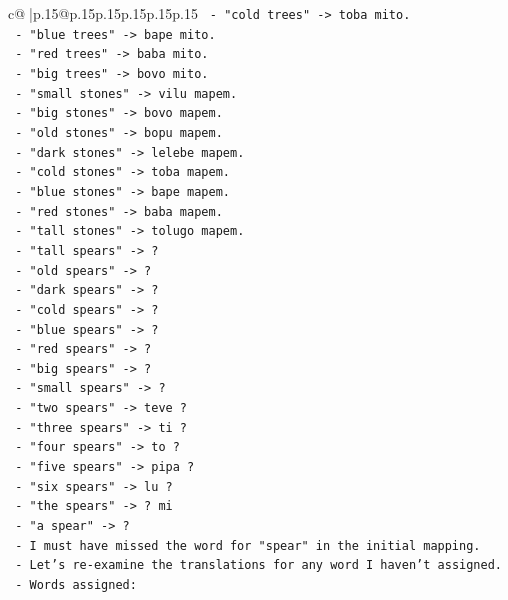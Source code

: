 \documentclass{article}
\begin{document}
{\begin{supertabular}{c@{$\;$}|p{.15\linewidth}@{}p{.15\linewidth}p{.15\linewidth}p{.15\linewidth}p{.15\linewidth}p{.15\linewidth}}
{{{\texttt{    {-} "cold trees" {-}> toba mito.} \\
\texttt{    {-} "blue trees" {-}> bape mito.} \\
\texttt{    {-} "red trees" {-}> baba mito.} \\
\texttt{    {-} "big trees" {-}> bovo mito.} \\
\texttt{    {-} "small stones" {-}> vilu mapem.} \\
\texttt{    {-} "big stones" {-}> bovo mapem.} \\
\texttt{    {-} "old stones" {-}> bopu mapem.} \\
\texttt{    {-} "dark stones" {-}> lelebe mapem.} \\
\texttt{    {-} "cold stones" {-}> toba mapem.} \\
\texttt{    {-} "blue stones" {-}> bape mapem.} \\
\texttt{    {-} "red stones" {-}> baba mapem.} \\
\texttt{    {-} "tall stones" {-}> tolugo mapem.} \\
\texttt{    {-} "tall spears" {-}> ?} \\
\texttt{    {-} "old spears" {-}> ?} \\
\texttt{    {-} "dark spears" {-}> ?} \\
\texttt{    {-} "cold spears" {-}> ?} \\
\texttt{    {-} "blue spears" {-}> ?} \\
\texttt{    {-} "red spears" {-}> ?} \\
\texttt{    {-} "big spears" {-}> ?} \\
\texttt{    {-} "small spears" {-}> ?} \\
\texttt{    {-} "two spears" {-}> teve ?} \\
\texttt{    {-} "three spears" {-}> ti ?} \\
\texttt{    {-} "four spears" {-}> to ?} \\
\texttt{    {-} "five spears" {-}> pipa ?} \\
\texttt{    {-} "six spears" {-}> lu ?} \\
\texttt{    {-} "the spears" {-}> ? mi} \\
\texttt{    {-} "a spear" {-}> ?} \\
\texttt{    {-} I must have missed the word for "spear" in the initial mapping.} \\
\texttt{    {-} Let's re{-}examine the translations for any word I haven't assigned.} \\
\texttt{    {-} Words assigned:} \\
}}}
\end{supertabular}}
\end{document}

